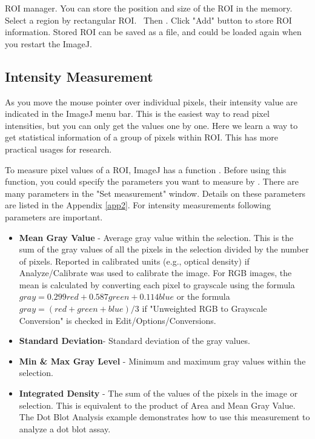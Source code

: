\begin{indentexercise}{5}
ROI manager. You can store the position and
size of the ROI in the memory. Select a region by rectangular ROI.
\ Then . Click "Add" button to store
ROI information. Stored ROI can be saved as a file, and could be loaded
again when you restart the ImageJ.
\end{indentexercise}


\subsection{Intensity Measurement}

As you move the mouse pointer over individual pixels, their intensity value are indicated in the ImageJ menu bar. This is the easiest way to
read pixel intensities, but you can only get the values one by one. Here we learn a way to get statistical information of a group
of pixels within ROI. This has more practical usages for research. 

To measure pixel values of a ROI, ImageJ has a function . Before using this function, you could specify the parameters 
you want to measure by . There are many parameters
in the "Set measurement" window. Details on these parameters are listed in the
Appendix \ref{app2}. For intensity measurements following parameters are
important.


\begin{itemize}
\item \textbf{Mean Gray Value} - Average gray value within the selection. This
is the sum of the gray values of all the pixels in the selection
divided by the number of pixels. Reported in calibrated units (e.g.,
optical density) if Analyze/Calibrate was used to calibrate the image.
For RGB images, the mean is calculated by converting each pixel to
grayscale using the formula $gray=0.299red+0.587green+0.114blue$ or the
formula $gray=(red+green+blue)/3$ if "Unweighted RGB to
Grayscale Conversion" is checked in Edit/Options/Conversions.

\item\textbf{Standard Deviation}{}- Standard deviation of the gray values.

\item\textbf{Min \& Max Gray Level} - Minimum and maximum gray values within
the selection.

\item\textbf{Integrated Density} - The sum of the values of the pixels in the
image or selection. This is equivalent to the product of Area and Mean
Gray Value. The Dot Blot Analysis example demonstrates how to use this
measurement to analyze a dot blot assay.
\end{itemize}

